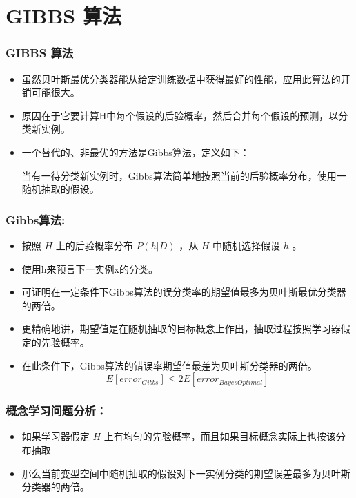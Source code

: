 \documentclass{beamer}
\begin{document}
\section{GIBBS 算法}
\label{sec-6}
\begin{frame}
\frametitle{GIBBS 算法}
\label{sec-6-1}

\begin{itemize}
\item 虽然贝叶斯最优分类器能从给定训练数据中获得最好的性能，应用此算法的开销可能很大。
\item 原因在于它要计算H中每个假设的后验概率，然后合并每个假设的预测，以分类新实例。
\item 一个替代的、非最优的方法是Gibbs算法，定义如下：
 
  当有一待分类新实例时，Gibbs算法简单地按照当前的后验概率分布，使用一随机抽取的假设。
\end{itemize}
\end{frame}
\begin{frame}
\frametitle{Gibbs算法:}
\label{sec-6-2}


\begin{itemize}
\item 按照 $H$ 上的后验概率分布 $P(h|D)$ ，从 $H$ 中随机选择假设 $h$ 。
\item 使用h来预言下一实例x的分类。
\item 可证明在一定条件下Gibbs算法的误分类率的期望值最多为贝叶斯最优分类器的两倍。
\item 更精确地讲，期望值是在随机抽取的目标概念上作出，抽取过程按照学习器假定的先验概率。
\item 在此条件下，Gibbs算法的错误率期望值最差为贝叶斯分类器的两倍。
   \[ E[error_{Gibbs}] \leq 2 E[error_{Bayes Optimal}] \]
\end{itemize}
\end{frame}
\begin{frame}
\frametitle{概念学习问题分析：}
\label{sec-6-3}

\begin{itemize}
\item 如果学习器假定 $H$ 上有均匀的先验概率，而且如果目标概念实际上也按该分布抽取
\item 那么当前变型空间中随机抽取的假设对下一实例分类的期望误差最多为贝叶斯分类器的两倍。
\end{itemize}
\end{frame}
\end{document}
